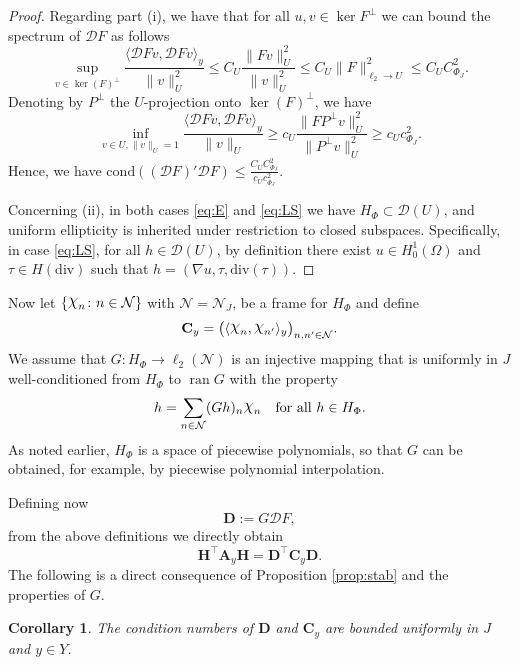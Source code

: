 \documentclass[a4paper,11pt]{amsart}
\DeclareMathOperator{\ran}{ran}
\numberwithin{equation}{section}
\newtheorem{cor}[theorem]{Corollary}
\theoremstyle{definition}
\theoremstyle{remark}
\theoremstyle{plain}
\newcommand{\Chi}{\raise .3ex
\hbox{\large $\chi$}}
\begin{document}
\begin{proof}
%
Regarding part (i), 
%
%
we have that for all $u,v \in \ker{F}^\perp$ we can bound the spectrum of $\mathcal DF$ as follows
\[
\sup_{v\in \ker( F)^\perp}\frac{\langle \mathcal DFv,\mathcal DFv\rangle_y}{\|v\|_U^2}\leq  C_{U}\frac{\| Fv\|^2_{U}}{\|v\|^2_{U}%
} \leq C_{U} \|F\|^2_{\ell_2\to U}\leq C_{U}C^2_{\Phi_J}.
 \]
Denoting by $P^\perp$ the $U$-projection onto $\ker(F)^\perp$, we have   
\[
\inf_{v\in U,\|v\|_U=1}\frac{\langle \mathcal DFv,\mathcal DFv\rangle_y}{\|v\|_U} \geq c_U\frac{ \|F P^\perp v\|^2_{U}}{\|P^\perp v\|^2_{U}} \geq c_{U} c^2_{\Phi_J}.
\]
Hence, we have $\mathrm{cond}((\mathcal D F)'\mathcal DF)\leq \frac{C_UC^2_{\Phi_J}}{c_Uc^2_{\Phi_J}}$.

Concerning (ii), in both cases \eqref{eq:E} and \eqref{eq:LS} we have
 $H_\Phi\subset \mathcal D (U)$, and uniform ellipticity is inherited under restriction to closed subspaces.
 Specifically, in case \eqref{eq:LS}, 
   for all $h\in\mathcal D(U)$, by definition there exist $u\in H^1_0(\Omega)$ and $\tau\in H(\mathrm{div})$ such that $h = (\nabla u,\tau,\mathrm{div}(\tau))$.
\end{proof}

Now let $\{ \Chi_n \colon n \in \mathcal N \}$ with $\mathcal N = \mathcal N_J$, be a frame for $H_\Phi$ and define 
\[
   \mathbf C_y = \bigl(  \langle \Chi_n, \Chi_{n'} \rangle_y  \bigr)_{n,n' \in \mathcal N}.
\]
We assume that $G \colon H_\Phi \to \ell_2(\mathcal N)$ is an injective mapping  that is uniformly in $J$ well-conditioned from $H_\Phi$ to $\ran G$ with the property
\[
      h = \sum_{n \in \mathcal N} (G h)_n \Chi_n \quad \text{for all $h \in H_\Phi$.}
\]
As noted earlier, $H_\Phi$ is a space of piecewise polynomials, so that $G$ can be obtained, for example, by piecewise polynomial interpolation.

Defining now
\[
  \mathbf D := G \mathcal D F,
\]
from the above definitions we directly obtain
\[
   \mathbf H^\intercal \mathbf A_y \mathbf H = \mathbf D^\intercal \mathbf C_y \mathbf D.
\]
The following is a direct consequence of Proposition \ref{prop:stab} and the properties of $G$. 

\begin{cor}
The condition numbers of $\mathbf D$ and $\mathbf C_y$ are bounded uniformly in $J$ and 
 $y\in Y$. 
\end{cor}
\end{document}
